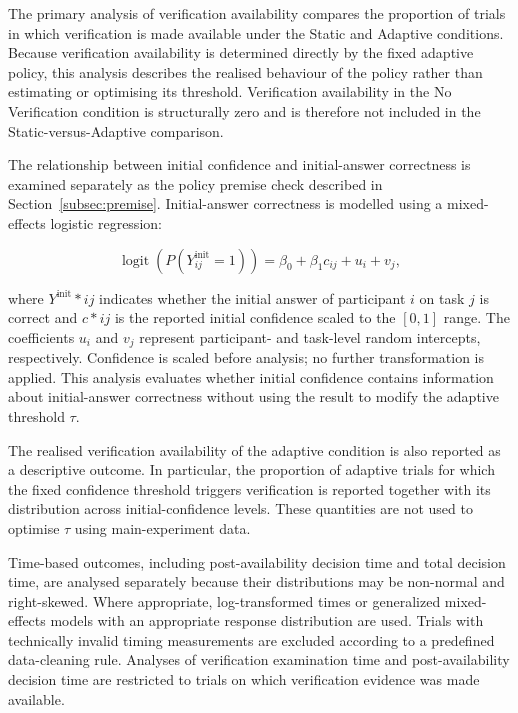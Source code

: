 \documentclass[oneside,final,14pt,a4paper]{extreport}
\begin{document}
The primary analysis of verification availability compares the proportion of
trials in which verification is made available under the Static and Adaptive
conditions. Because verification availability is determined directly by the
fixed adaptive policy, this analysis describes the realised behaviour of the
policy rather than estimating or optimising its threshold. Verification
availability in the No Verification condition is structurally zero and is
therefore not included in the Static-versus-Adaptive comparison.

The relationship between initial confidence and initial-answer correctness is
examined separately as the policy premise check described in
Section~\ref{subsec:premise}. Initial-answer correctness is modelled using a
mixed-effects logistic regression:

$$
\operatorname{logit}\!\left(
P(Y^{\mathrm{init}}_{ij}=1)
\right)
=
\beta_0
+
\beta_1 c_{ij}
+
u_i
+
v_j,
$$

where $Y^{\mathrm{init}}*{ij}$ indicates whether the initial answer of
participant $i$ on task $j$ is correct and $c*{ij}$ is the reported initial
confidence scaled to the $[0,1]$ range. The coefficients $u_i$ and $v_j$
represent participant- and task-level random intercepts, respectively.
Confidence is scaled before analysis; no further transformation is applied.
This analysis evaluates whether initial confidence contains information about
initial-answer correctness without using the result to modify the adaptive
threshold $\tau$.

The realised verification availability of the adaptive condition is also
reported as a descriptive outcome. In particular, the proportion of adaptive
trials for which the fixed confidence threshold triggers verification is
reported together with its distribution across initial-confidence levels.
These quantities are not used to optimise $\tau$ using main-experiment data.

Time-based outcomes, including post-availability decision time and total
decision time, are analysed separately because their distributions may be
non-normal and right-skewed. Where appropriate, log-transformed times or
generalized mixed-effects models with an appropriate response distribution
are used. Trials with technically invalid timing measurements are excluded
according to a predefined data-cleaning rule. Analyses of verification
examination time and post-availability decision time are restricted to trials
on which verification evidence was made available.
\end{document}

